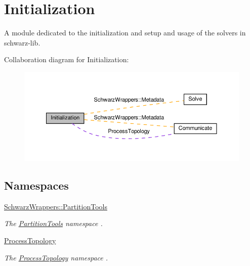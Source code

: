 \hypertarget{group__init}{}\section{Initialization}
\label{group__init}


A module dedicated to the initialization and setup and usage of the solvers in schwarz-\/lib.  


Collaboration diagram for Initialization\+:
\nopagebreak
\begin{figure}[H]
\begin{center}
\leavevmode
\includegraphics[width=350pt]{group__init}
\end{center}
\end{figure}
\subsection*{Namespaces}
\begin{DoxyCompactItemize}
\item 
 \hyperlink{namespaceSchwarzWrappers_1_1PartitionTools}{Schwarz\+Wrappers\+::\+Partition\+Tools}
\begin{DoxyCompactList}\small\item\em The \hyperlink{namespaceSchwarzWrappers_1_1PartitionTools}{Partition\+Tools} namespace . \end{DoxyCompactList}\item 
 \hyperlink{namespaceProcessTopology}{Process\+Topology}
\begin{DoxyCompactList}\small\item\em The \hyperlink{namespaceProcessTopology}{Process\+Topology} namespace . \end{DoxyCompactList}\end{DoxyCompactItemize}
